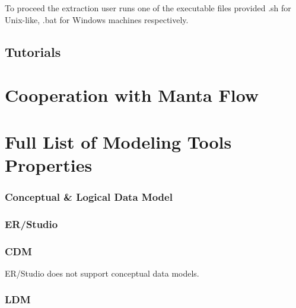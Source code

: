 \documentclass[12pt,a4paper]{report}
\begin{document}
To proceed the extraction user runs one of the executable files provided .sh for Unix-like, .bat for Windows machines respectively.


\subsection{Tutorials}

\section{Cooperation with Manta Flow}

\section{Full List of Modeling Tools Properties}

\subsubsection{Conceptual \& Logical Data Model}

\subsubsection{ER/Studio}

\subsubsection{CDM}

ER/Studio does not support conceptual data models.

\subsubsection{LDM}
\end{document}
